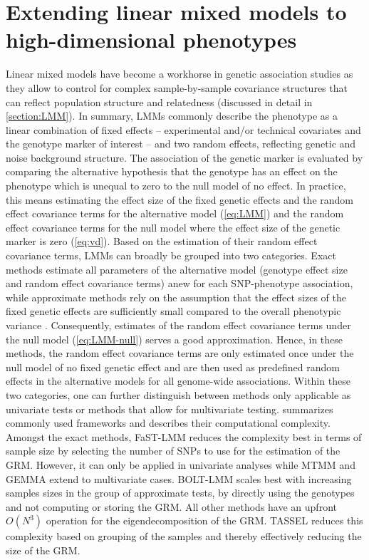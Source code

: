 \chapter{Extending linear mixed models to high-dimensional phenotypes}
\label{chapter:limmbo}
Linear mixed models have become a workhorse in genetic association studies as they allow to control for complex sample-by-sample covariance structures that can reflect population structure and relatedness (discussed in detail in \cref{section:LMM}). In summary, LMMs commonly describe the phenotype as a linear combination of fixed effects -- experimental and/or technical  covariates and the genotype marker of interest -- and two random effects, reflecting genetic and noise background structure. The association of the genetic marker is evaluated by comparing the alternative hypothesis that the genotype has an effect on the phenotype which is unequal to zero to the null model of no effect. In practice, this means estimating the effect size of the fixed genetic effects and the random effect covariance terms for the alternative model (\cref{eq:LMM}) and the random effect covariance terms for the null model where the effect size of the genetic marker is zero (\cref{eq:vd}). Based on the estimation of their random effect covariance terms, LMMs can broadly be grouped into two categories. Exact methods estimate all parameters of the alternative model (genotype effect size and random effect covariance terms) anew for each SNP-phenotype association, while approximate methods rely on the assumption that the effect sizes of the fixed genetic effects are sufficiently small compared to the overall phenotypic variance \citep{Kang2010,Zhang2010}. Consequently, estimates of the random effect covariance terms under the null model (\cref{eq:LMM-null}) serves a good approximation. Hence, in these methods, the random effect covariance terms are only estimated once under the null model of no fixed genetic effect and are then used as predefined random effects in the alternative models for all genome-wide associations. Within these two categories, one can further distinguish between methods only applicable as univariate tests or methods that allow for multivariate testing.  summarizes commonly used frameworks and describes their computational complexity.  Amongst the exact methods, FaST-LMM reduces the complexity best in terms of sample size by selecting the number of SNPs to use for the estimation of the GRM.  However, it can only be applied in univariate analyses while MTMM and GEMMA extend to multivariate cases.  BOLT-LMM scales best with increasing samples sizes in the group of approximate tests, by directly using the genotypes and not computing or storing the GRM. All other methods have an upfront \(O(N^3)\) operation for the eigendecomposition of the GRM. TASSEL reduces this complexity based on grouping of the samples and thereby effectively reducing the size of the GRM.

